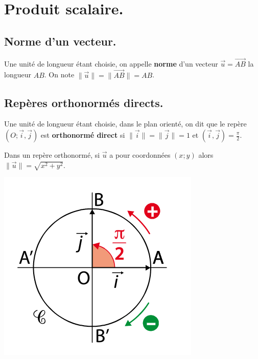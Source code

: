 \documentclass[a4paper,11pt]{article}
\theoremstyle{break}
\begin{document}
\newpage
 
  \section{Produit scalaire.}
 
 \subsection{Norme d'un vecteur.}
 
 \begin{definition}
  Une unité de longueur étant choisie, on appelle \textbf{norme} d'un vecteur $\vec{u}=\vec{AB}$
  la longueur $AB$. On note $\|\vec{u}\|=\|\vec{AB}\|=AB$.
 \end{definition}

 \subsection{Repères orthonormés directs.}
 
 \begin{definition}
  Une unité de longueur étant choisie, dans le plan orienté, on dit que le repère $(O;\vec{i},\vec{j})$
  est \textbf{orthonormé direct} si $\| \vec{i} \|=\| \vec{j}\|=1$ et $(\vec{i},\vec{j})=\frac{\pi}{2}$.
  
  Dans un repère orthonormé, si $\vec{u}$ a pour coordonnées $(x;y)$ alors $\|\vec{u}\|=\sqrt{x^2+y^2}$.
  
   \begin{center}
    \includegraphics[scale=0.5]{../Images/repereOrthoDirect.png}
  \end{center}
  
 \end{definition}
\end{document}
